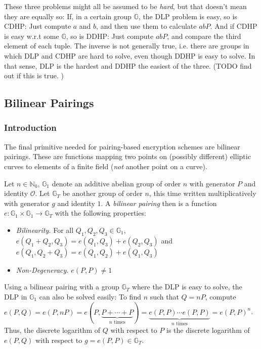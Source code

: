 These three problems might all be assumed to be \emph{hard}, but that doesn't mean they are equally so:
If, in a certain group $\mathbb{G}$, the DLP problem is easy, so is CDHP: Just compute $a$ and $b$, and then use them to calculate $abP$.
And if CDHP is easy w.r.t some $\mathbb{G}$, so is DDHP: Just compute $abP$, and compare the third element of each tuple.
The inverse is not generally true, i.e. there are groups in which DLP and CDHP are hard to solve, even though DDHP is easy to solve.
In that sense, DLP is the hardest and DDHP the easiest of the three. \cite{katz_introduction_2015} (TODO find out if this is true. \cite{menezes_introduction_2009})

\subsection{Bilinear Pairings}
\subsubsection{Introduction}
The final primitive needed for pairing-based encryption schemes are bilinear pairings. These are functions mapping two points on (possibly different) elliptic curves to elements of a finite field (\emph{not} another point on a curve).\cite{blake_advances_2005}

Let $n \in \mathbb{N}_0$, $\mathbb{G}_1$ denote an additive abelian group of order $n$ with generator $P$ and identity $\mathcal{O}$. 
Let $\mathbb{G}_T$ be another group of order $n$, this time written multiplicatively with generator $g$ and identity $1$.
A \emph{bilinear pairing} then is a function $e: \mathbb{G}_1 \times \mathbb{G}_1 \rightarrow \mathbb{G}_T$ with the following properties:
\begin{itemize}
    \item \emph{Bilinearity.} For all $Q_1, Q_2, Q_3 \in \mathbb{G}_1$, $e(Q_1+Q_2, Q_3) = e(Q_1,Q_3)+e(Q_2,Q_3)$ and $e(Q_1, Q_2+Q_3)=e(Q_1,Q_2)+e(Q_1,Q_3)$
    \item \emph{Non-Degeneracy.} $e(P,P) \neq 1$
\end{itemize}

Using a bilinear pairing with a group $\mathbb{G}_T$ where the DLP is easy to solve, the DLP in $\mathbb{G}_1$ can also be solved easily:
To find $n$ such that $Q = nP$, compute $e(P,Q) = e(P, nP) = e(P, \underbrace{P+\cdots+P}_{n \text{ times}}) = \underbrace{e(P,P) \cdots e(P,P)}_{n \text{ times}} = e(P,P)^n$.
Thus, the discrete logarithm of $Q$ with respect to $P$ is the discrete logarithm of $e(P,Q)$ with respect to $g = e(P,P) \in \mathbb{G}_T$.~\cite{menezes_introduction_2009}

